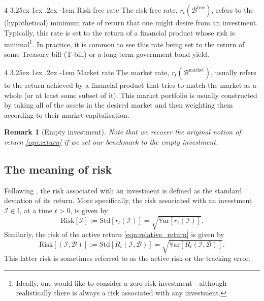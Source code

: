 \documentclass[12pt]{article}
\makeatletter
\newtheorem{remark}{Remark}[section]
\renewcommand\paragraph{%
	\@startsection{paragraph}
	{4}
	{\z@}
	{3.25ex \@plus1ex \@minus.2ex}
	{-1em}
	{\normalfont\normalsize\bfseries\maybe@addperiod}%
}
\newcommand{\maybe@addperiod}[1]{%
	#1\@addpunct{.}%
}
\makeatother
\begin{document}
\paragraph{Risk-free rate} The risk-free rate, $r_t(\mathcal{B}^{\text{free}})$, refers to the (hypothetical) minimum rate of return that one might desire from an investment. Typically, this rate is set to the return of a financial product whose risk is minimal\footnote{Ideally, one would like to consider a zero risk investment---although realistically there is always a risk associated with any investment.}. In practice, it is common to see this rate being set to the return of some Treasury bill (T-bill) or a long-term government bond yield.

\paragraph{Market rate} The market rate, $r_t(\mathcal{B}^{\text{market}})$, usually refers to the return achieved by a financial product that tries to match the market as a whole (or at least some subset of it). This market portfolio is usually constructed by taking all of the assets in the desired market and then weighting them according to their market capitalisation.

\begin{remark}
	[Empty investment] Note that we recover the original notion of return \eqref{eqn:return} if we set our benchmark to the empty investment.
\end{remark}
\subsection{The meaning of risk}
Following \cite{grinold1999}, the risk associated with an investment is defined as the standard deviation of its return. More specifically, the risk associated with an investment $\mathcal{I} \in \mathbb{I}$, at a time $t > 0$, is given by
\begin{equation}
	\text{Risk}[\mathcal{I}] := \text{Std}[r_t(\mathcal{I})] = \sqrt{\mathbb{V}\text{ar}[r_t(\mathcal{I})]}.
\end{equation}
Similarly, the risk of the active return \eqref{eqn:relative_return} is given by 
\begin{equation}
	\text{Risk}[(\mathcal{I}, \mathcal{B})] := \text{Std}[R_t(\mathcal{I}, \mathcal{B})] = \sqrt{\mathbb{V}\text{ar}[R_t(\mathcal{I}, \mathcal{B})]}.
\end{equation}
This latter risk is sometimes referred to as the active risk or the tracking error.
\end{document}
